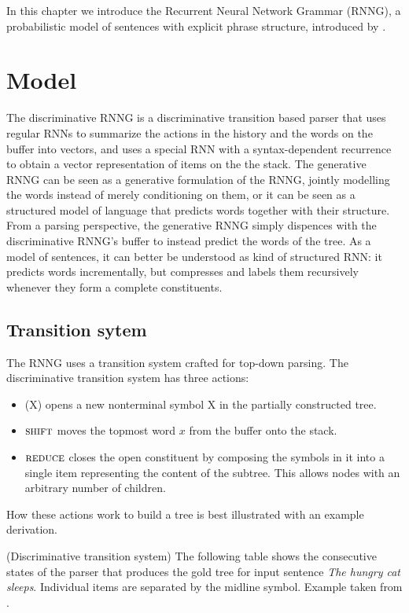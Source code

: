 % 

In this chapter we introduce the Recurrent Neural Network Grammar (RNNG), a probabilistic model of sentences with explicit phrase structure, introduced by \citet{dyer2016rnng}.

\section{Model}
The discriminative RNNG is a discriminative transition based parser that uses regular RNNs to summarize the actions in the history and the words on the buffer into vectors, and uses a special RNN with a syntax-dependent recurrence to obtain a vector representation of items on the the stack. The generative RNNG can be seen as a generative formulation of the RNNG, jointly modelling the words instead of merely conditioning on them, or it can be seen as a structured model of language that predicts words together with their structure. From a parsing perspective, the generative RNNG simply dispences with the discriminative RNNG's buffer to instead predict the words of the tree. As a model of sentences, it can better be understood as kind of structured RNN: it predicts words incrementally, but compresses and labels them recursively whenever they form a complete constituents.

\subsection{Transition sytem}
The RNNG uses a transition system crafted for top-down parsing. The discriminative transition system has three actions:
\begin{itemize}
  \item \open(X) opens a new nonterminal symbol X in the partially constructed tree.
  \item $\textsc{shift}$ moves the topmost word $x$ from the buffer onto the stack.
  \item $\textsc{reduce}$ closes the open constituent by composing the symbols in it into a single item representing the content of the subtree. This allows nodes with an arbitrary number of children.
\end{itemize}
How these actions work to build a tree is best illustrated with an example derivation.

\begin{example}{(Discriminative transition system)}
  \label{ex:disc-states}
  The following table shows the consecutive states of the parser that produces the gold tree for input sentence \textit{The hungry cat sleeps}. Individual items are separated by the midline symbol. Example taken from \citet{dyer2016rnng}.
  
\end{example}

